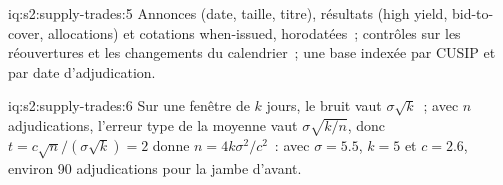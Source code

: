 \begin{solution}{iq:s2:supply-trades:5}
Annonces (date, taille, titre), résultats (high yield, bid-to-cover, allocations) et cotations when-issued, horodatées~; contrôles sur les réouvertures
et les changements du calendrier~; une base indexée par CUSIP et par date d'adjudication.
\end{solution}

\begin{solution}{iq:s2:supply-trades:6}
Sur une fenêtre de $k$ jours, le bruit vaut $\sigma\sqrt k$~; avec $n$ adjudications, l'erreur type de la moyenne vaut $\sigma\sqrt{k/n}$, donc $t = c\sqrt n/(\sigma\sqrt
k) = 2$ donne $n = 4k\sigma^2/c^2$~: avec $\sigma = 5.5$, $k = 5$ et $c = 2.6$, environ 90 adjudications pour la jambe d'avant.
\end{solution}
